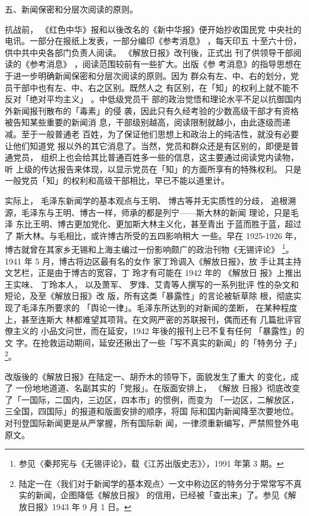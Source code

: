 五、新闻保密和分层次阅读的原则。

抗战前，
《红色中华》报和以後改名的《新中华报》便开始抄收国民党
中央社的电讯。一部分在报纸上发表，一部分编印《参考消息》
，每天印五
十至六十份，供中共中央各部门负责人阅读。
《解放日报》改刊後，正式出
刊了供领导干部阅读的《参考消息》
，阅读范围较前有一些扩大。出版《参
考消息》的指导思想在于进一步明确新闻保密和分层次阅读的原则。因为
群众有左、中、右的划分，党员干部中也有左、中、右之区别。既然人之
有区别，在「知」的权利上就不能不反对「绝对平均主义」
。中低级党员干
部的政治觉悟和理论水平不足以抗御国内外新闻报刊散布的「毒素」的侵
袭，因此只有久经考验的少数高级干部才有资格被告知某些重要的新闻消
息，干部级别越高，阅读限制就越小，由此逐级而递减。至于一般普通老
百姓，为了保证他们思想上和政治上的纯洁性，就没有必要让他们知道党
报以外的其它消息了。当然，党员和群众还是有区别的，即便是普通党员，
组织上也会给其比普通百姓多一些的信息，这主要通过阅读党内读物，听
上级的传达报告来体现，以显示党员在「知」的方面所享有的特殊权利。
只是一般党员「知」的权利和高级干部相比，早已不能以道里计。

实际上， 毛泽东新闻学的基本观点与王明、 博古等并无实质性的分歧， 追根溯
源，毛泽东与王明、博古一样，师承的都是列宁——斯大林的新闻 理论，只是毛泽
东比王明、博古更加党化、更加斯大林主义化，甚至青出 于蓝而胜于蓝，超过了
斯大林。与毛相比，或许博古所受的五四影响稍大 一些。早在 1925-1926 年，
博古就曾在其家乡无锡和上海主编过一份影响颇广的政治刊物《无锡评论》
\footnote{参见〈秦邦宪与《无锡评论》，载《江苏出版史志》〉，1991 年第
3 期。}。1941 年 5 月，博古将边区最有名的女作 家丁玲调入《解放日报》，放
手让其主持文艺栏，正是由于博古的宽容，丁 玲才有可能在 1942 年的 《解放日
报》上推出王实味、 丁玲本人， 以及萧军、 罗烽、艾青等人撰写的一系列批评
性的杂文和短论，及至《解放日报》改 版，所有这类「暴露性」的言论被斩草除
根，彻底实现了毛泽东所要求的 「舆论一律」。毛泽东所达到的对新闻的垄断，
在某种程度上，甚至连斯大 林都难望其项背。在文网严密的苏联报刊，偶而还有
几篇批评官僚主义的 小品文问世，而在延安，1942 年後的报刊上已不复有任何
「暴露性」的文
字。在抢救运动期间，延安还揪出了一些「写不真实的新闻」的「特务分
子」\footnote{陆定一在〈我们对于新闻学的基本观点〉一文中称边区的特务分于常常写不真实的新闻，企图降低《解放日报》
的信用，已经被「查出来」了。参见《解放日报》1943 年 9 月 1 日。}。
 

改版後的《解放日报》在陆定一、胡乔木的领导下，面貌发生了重大 的变化，成了
一份地地道道、名副其实的「党报」。在版面安排上， 《解放 日报》彻底改变
了「一国际，二国内，三边区，四本市」的惯例，而变为 「一边区，二解放区，
三全国，四国际」的报道和版面安排的顺序，将国 际和国内新闻降至次要地位。
对刊登国际新闻更是从严掌握，所有国际新 闻，一律须重新编写，严禁照登外电
原文。

